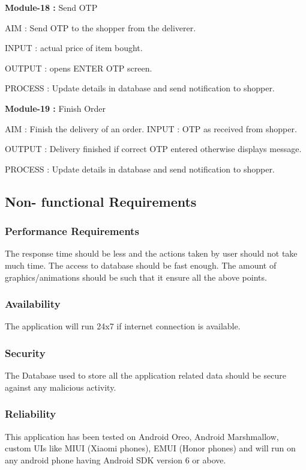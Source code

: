 \documentclass{report}
\begin{document}
\noindent \newline \textbf{Module-18 :} Send OTP
\begin{description}
\item AIM : Send OTP to the shopper from the deliverer.
\item INPUT : actual price of item bought.
\item OUTPUT : opens ENTER OTP screen.
\item PROCESS : Update details in database and send notification to shopper.
\end{description}

\noindent \newline \textbf{Module-19 :} Finish Order
\begin{description}
\item AIM : Finish the delivery of an order.
INPUT : OTP as received from shopper.
\item OUTPUT : Delivery finished if correct OTP entered otherwise displays message.
\item PROCESS : Update details in database and send notification to shopper.
\end{description}

\subsection{Non- functional Requirements}

\subsubsection{Performance Requirements}
The response time should be less and the actions taken by user should not take much time. The access to database should be fast enough. The amount of graphics/animations should be such that it ensure all the above points.

\subsubsection{Availability}
The application will run 24x7 if internet connection is available.

\subsubsection{Security}
The Database used to store all the application related data should be secure against any malicious activity.

\subsubsection{Reliability}
This application has been tested on Android Oreo, Android Marshmallow, custom UIs like MIUI (Xiaomi phones), EMUI (Honor phones) and will run on any android phone having Android SDK version 6 or above.
\end{document}

